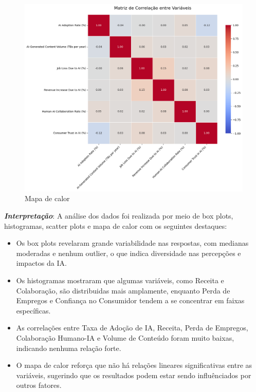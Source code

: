 \documentclass[12pt]{article}
\begin{document}
\begin{itemize}
\begin{figure}[H]
        \includegraphics[width=1\textwidth]{heatmap.png}
        \caption{Mapa de calor}
    \end{figure}
\end{itemize}

\textbf{\textit{Interpretação}}: A análise dos dados foi realizada por meio de box plots, histogramas, scatter plots e mapa de calor com os seguintes destaques:

\begin{itemize}
  \item Os box plots revelaram grande variabilidade nas respostas, com medianas moderadas e nenhum outlier, o que indica diversidade nas percepções e impactos da IA.
  
  \item Os histogramas mostraram que algumas variáveis, como Receita e Colaboração, são distribuidas mais amplamente, enquanto Perda de Empregos e Confiança no Consumidor tendem a se concentrar em faixas específicas.
  
  \item As correlações entre Taxa de Adoção de IA, Receita, Perda de Empregos, Colaboração Humano-IA e Volume de Conteúdo foram muito baixas, indicando nenhuma relação forte.

  \item O mapa de calor reforça que não há relações lineares significativas entre as variáveis, sugerindo que os resultados podem estar sendo influênciados por outros fatores.
\end{itemize}
\end{document}
